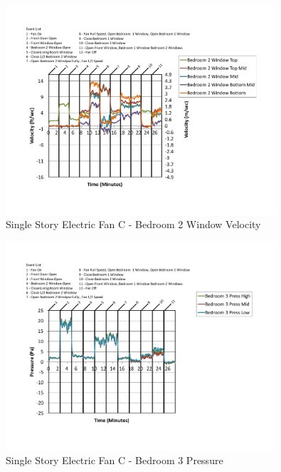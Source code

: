 \documentclass{article}
\begin{document}
\begin{appendices}
	\begin{figure}[H]
		\centering
		\includegraphics[height=3.05in,trim=0.67in 1.1in 0.67in 0.8in,clip=true]{0_Images/Results_Charts/ColdFlow/Single_Story/Electric/C/Bedroom_2_Window_Velocity.pdf}
		\caption{Single Story Electric Fan C - Bedroom 2 Window Velocity}
	\end{figure}
 

	\begin{figure}[H]
		\centering
		\includegraphics[height=3.05in,trim=0.67in 1.1in 0.67in 0.8in,clip=true]{0_Images/Results_Charts/ColdFlow/Single_Story/Electric/C/Bedroom_3_Pressure.pdf}
		\caption{Single Story Electric Fan C - Bedroom 3 Pressure}
	\end{figure}
 
	\clearpage


\end{appendices}
\end{document}
